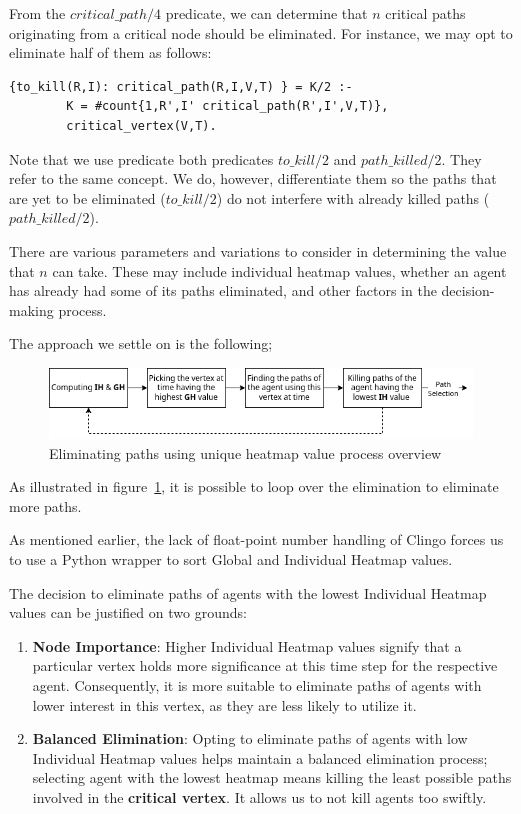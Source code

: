 From the \(critical\_path/4\) predicate, we can determine that \(n\) critical paths originating from a critical node should be eliminated. For instance, we may opt to eliminate half of them as follows:

\begin{minipage}[H]{\linewidth}
\begin{lstlisting}[style=mystyle]
    {to_kill(R,I): critical_path(R,I,V,T) } = K/2 :-
        K = #count{1,R',I' critical_path(R',I',V,T)},
        critical_vertex(V,T).
\end{lstlisting}
\end{minipage}

Note that we use predicate both predicates \(to\_kill/2\) and \(path\_killed/2\). They refer to the same concept. We do, however, differentiate them so the paths that are yet to be eliminated (\(to\_kill/2\)) do not interfere with already killed paths (\(path\_killed/2\)).  

There are various parameters and variations to consider in determining the value that \(n\) can take. These may include individual heatmap values, whether an agent has already had some of its paths eliminated, and other factors in the decision-making process.

The approach we settle on is the following;

\begin{figure}[H]
    \centering
    \caption{Eliminating paths using unique heatmap value process overview}\label{fig:simple_heatmap_value_elimination}
    \includegraphics[width=\widthimg]{img/simple_heatmap_value.drawio.png}
\end{figure}

As illustrated in figure~\ref{fig:simple_heatmap_value_elimination}, it is possible to loop over the elimination to eliminate more paths. 

As mentioned earlier, the lack of float-point number handling of Clingo forces us to use a Python wrapper to sort Global and Individual Heatmap values.

The decision to eliminate paths of agents with the lowest Individual Heatmap values can be justified on two grounds:
\begin{enumerate}
    \item \textbf{Node Importance}: Higher Individual Heatmap values signify that a particular vertex holds more significance at this time step for the respective agent. Consequently, it is more suitable to eliminate paths of agents with lower interest in this vertex, as they are less likely to utilize it.
    \item \textbf{Balanced Elimination}: Opting to eliminate paths of agents with low Individual Heatmap values helps maintain a balanced elimination process; selecting agent with the lowest heatmap means killing the least possible paths involved in the \textbf{critical vertex}. It allows us to not kill agents too swiftly. 
\end{enumerate}

